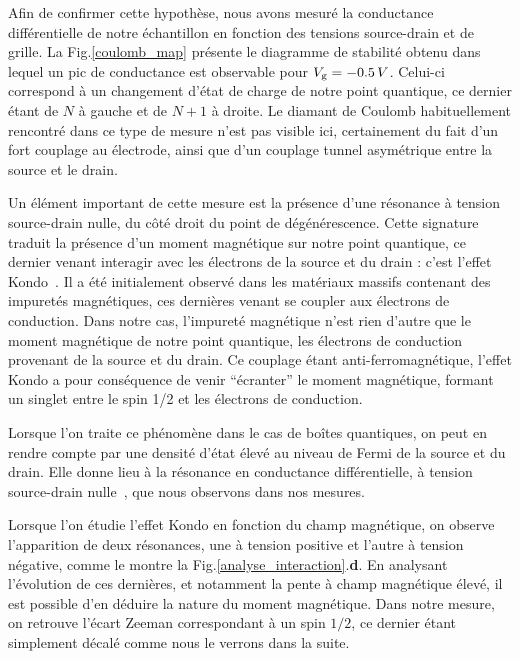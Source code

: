Afin de confirmer cette hypothèse, nous avons mesuré la conductance différentielle de notre échantillon en fonction des tensions source-drain et de grille. La Fig.\ref{coulomb_map} présente le diagramme de stabilité obtenu dans lequel un pic de conductance est observable pour $V_{\rm{g}}=-0.5\,V$. Celui-ci correspond à un changement d'état de charge de notre point quantique, ce dernier étant de $N$ à gauche et de $N+1$ à droite. Le diamant de Coulomb habituellement rencontré dans ce type de mesure n'est pas visible ici, certainement du fait d'un fort couplage au électrode, ainsi que d'un couplage tunnel asymétrique entre la source et le drain.

Un élément important de cette mesure est la présence d'une résonance à tension source-drain nulle, du côté droit du point de dégénérescence. Cette signature traduit la présence d'un moment magnétique sur notre point quantique, ce dernier venant interagir avec les électrons de la source et du drain : c'est l'effet Kondo~\cite{Kondo1964,Wilson1975,Goldhaber-Gordon1998}.
 Il a été initialement observé dans les matériaux massifs contenant des impuretés magnétiques, ces dernières venant se coupler aux électrons de conduction. Dans notre cas, l'impureté magnétique n'est rien d'autre que le moment magnétique de notre point quantique, les électrons de conduction provenant de la source et du drain. Ce couplage étant anti-ferromagnétique, l'effet Kondo a pour conséquence de venir ``écranter'' le moment magnétique, formant un singlet entre le spin 1/2 et les électrons de conduction.

Lorsque l'on traite ce phénomène dans le cas de boîtes quantiques, on peut en rendre compte par une densité d'état élevé au niveau de Fermi de la source et du drain. Elle donne lieu à la résonance en conductance différentielle, à tension source-drain nulle~\cite{Goldhaber-Gordon1998}, que nous observons dans nos mesures.

Lorsque l'on étudie l'effet Kondo en fonction du champ magnétique, on observe l'apparition de deux résonances, une à tension positive et l'autre à tension négative, comme le montre la Fig.\ref{analyse_interaction}.\textbf{d}. En analysant l'évolution de ces dernières, et notamment la pente à champ magnétique élevé, il est possible d'en déduire la nature du moment magnétique. Dans notre mesure, on retrouve l'écart Zeeman correspondant à un spin $1/2$, ce dernier étant simplement décalé comme nous le verrons dans la suite.


